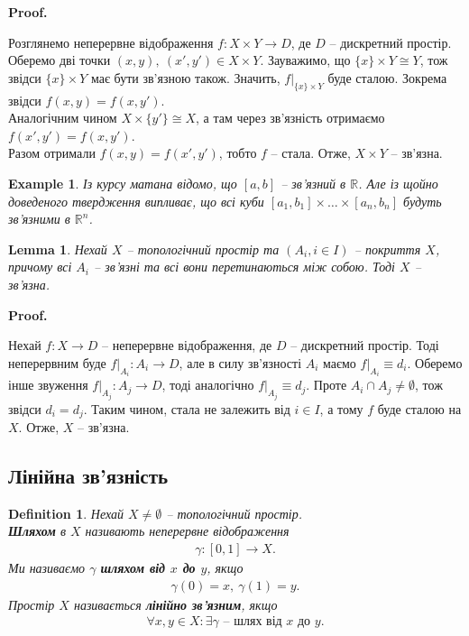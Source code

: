 \documentclass[a4paper, 10pt]{article}
\makeatletter
\theoremstyle{theoremdd}
\newtheorem{definition}[theorem]{Definition}
\newtheorem{example}[theorem]{Example}
\newtheorem{lemma}[theorem]{Lemma}
\renewenvironment{proof}[1][Proof.\\]{\par
\pushQED{\hfill \qed}%
\normalfont \topsep6\p@\@plus6\p@\relax
\trivlist
\item\relax
{\bfseries
#1\@addpunct{.}}\hspace\labelsep\ignorespaces
}{%
\popQED\endtrivlist\@endpefalse
}
\makeatother
\begin{document}
\begin{proof}
Розглянемо неперервне відображення $f \colon X \times Y \to D$, де $D$ -- дискретний простір. Оберемо дві точки $(x,y),\ (x',y') \in X \times Y$. Зауважимо, що $\{x\} \times Y \cong Y$, тож звідси $\{x\} \times Y$ має бути зв'язною також. Значить, $f|_{\{x\} \times Y}$ буде сталою. Зокрема звідси $f(x,y) = f(x,y')$.\\
Аналогічним чином $X \times \{y'\} \cong X$, а там через зв'язність отримаємо $f(x',y') = f(x,y')$.\\
Разом отримали $f(x,y) = f(x',y')$, тобто $f$ -- стала. Отже, $X \times Y$ -- зв'язна.
\end{proof}

\begin{example}
Із курсу матана відомо, що $[a,b]$ -- зв'язний в $\mathbb{R}$. Але із щойно доведеного твердження випливає, що всі куби $[a_1, b_1] \times \dots \times [a_n, b_n]$ будуть зв'язними в $\mathbb{R}^n$.
\end{example}

\begin{lemma}
Нехай $X$ -- топологічний простір та $(A_i, i \in I)$ -- покриття $X$, причому всі $A_i$ -- зв'язні та всі вони перетинаються між собою. Тоді $X$ -- зв'язна.
\end{lemma}

\begin{proof}
Нехай $f \colon X \to D$ -- неперервне відображення, де $D$ -- дискретний простір. Тоді неперервним буде $f|_{A_i} \colon A_i \to D$, але в силу зв'язності $A_i$ маємо $f|_{A_i} \equiv d_i$. Оберемо інше звуження $f|_{A_j} \colon A_j \to D$, тоді аналогічно $f|_{A_j} \equiv d_j$. Проте $A_i \cap A_j \neq \emptyset$, тож звідси $d_i = d_j$. Таким чином, стала не залежить від $i \in I$, а тому $f$ буде сталою на $X$. Отже, $X$ -- зв'язна.
\end{proof}

\subsection{Лінійна зв'язність}
\begin{definition}
Нехай $X \neq \emptyset$ -- топологічний простір.\\
\textbf{Шляхом} в $X$ називають неперервне відображення
\begin{align*}
\gamma \colon [0,1] \to X.
\end{align*}
Ми називаємо $\gamma$ \textbf{шляхом від $x$ до $y$}, якщо
\begin{align*}
\gamma(0) = x,\ \gamma(1) = y.
\end{align*}
Простір $X$ називається \textbf{лінійно зв'язним}, якщо
\begin{align*}
\forall x,y \in X: \exists \gamma \text{ -- шлях від $x$ до $y$.}
\end{align*}
\end{definition}
\end{document}
